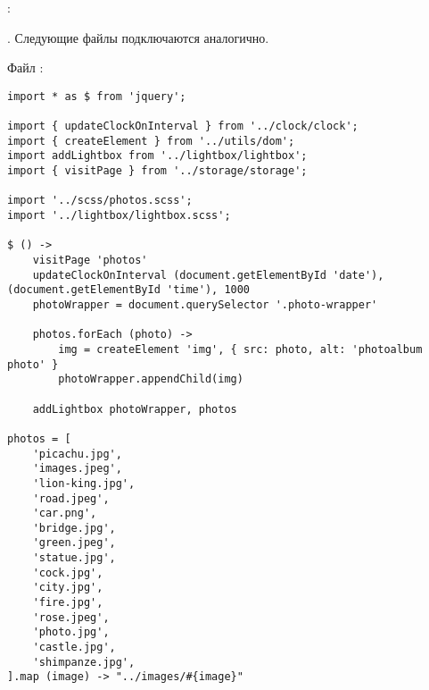 \documentclass[a4paper,14pt]{extarticle}
\begin{document}
:

.
Следующие файлы подключаются аналогично.

Файл :
\begin{lstlisting}
import * as $ from 'jquery';

import { updateClockOnInterval } from '../clock/clock';
import { createElement } from '../utils/dom';
import addLightbox from '../lightbox/lightbox';
import { visitPage } from '../storage/storage';

import '../scss/photos.scss';
import '../lightbox/lightbox.scss';

$ () ->
    visitPage 'photos'
    updateClockOnInterval (document.getElementById 'date'), (document.getElementById 'time'), 1000
    photoWrapper = document.querySelector '.photo-wrapper'

    photos.forEach (photo) ->
        img = createElement 'img', { src: photo, alt: 'photoalbum photo' }
        photoWrapper.appendChild(img)

    addLightbox photoWrapper, photos

photos = [
    'picachu.jpg',
    'images.jpeg',
    'lion-king.jpg',
    'road.jpeg',
    'car.png',
    'bridge.jpg',
    'green.jpeg',
    'statue.jpg',
    'cock.jpg',
    'city.jpg',
    'fire.jpg',
    'rose.jpeg',
    'photo.jpg',
    'castle.jpg',
    'shimpanze.jpg',
].map (image) -> "../images/#{image}"
\end{lstlisting}
\end{document}
